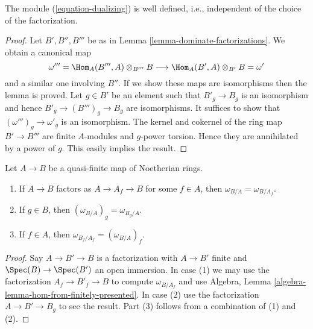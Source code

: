 \begin{lemma}
\label{lemma-dualizing-well-defined}
The module (\ref{equation-dualizing}) is well defined, i.e.,
independent of the choice of the factorization.
\end{lemma}

\begin{proof}
Let $B', B'', B'''$ be as in Lemma \ref{lemma-dominate-factorizations}.
We obtain a canonical map
$$
\omega''' = \Hom_A(B''', A) \otimes_{B'''} B \longrightarrow
\Hom_A(B', A) \otimes_{B'} B = \omega'
$$
and a similar one involving $B''$. If we show these maps are isomorphisms
then the lemma is proved. Let $g \in B'$ be an element such that
$B'_g \to B_g$ is an isomorphism and hence $B'_g \to (B''')_g \to B_g$
are isomorphisms. It suffices to show that $(\omega''')_g \to \omega'_g$
is an isomorphism. The kernel and cokernel of the ring map $B' \to B'''$
are finite $A$-modules and $g$-power torsion.
Hence they are annihilated by a power of $g$.
This easily implies the result.
\end{proof}

\begin{lemma}
\label{lemma-localize-dualizing}
Let $A \to B$ be a quasi-finite map of Noetherian rings.
\begin{enumerate}
\item If $A \to B$ factors as $A \to A_f \to B$ for some $f \in A$,
then $\omega_{B/A} = \omega_{B/A_f}$.
\item If $g \in B$, then $(\omega_{B/A})_g = \omega_{B_g/A}$.
\item If $f \in A$, then $\omega_{B_f/A_f} = (\omega_{B/A})_f$.
\end{enumerate}
\end{lemma}

\begin{proof}
Say $A \to B' \to B$ is a factorization with $A \to B'$ finite and
$\Spec(B) \to \Spec(B')$ an open immersion. In case (1) we may use
the factorization $A_f \to B'_f \to B$ to compute $\omega_{B/A_f}$
and use Algebra, Lemma \ref{algebra-lemma-hom-from-finitely-presented}.
In case (2) use the factorization $A \to B' \to B_g$ to see the result.
Part (3) follows from a combination of (1) and (2).
\end{proof}

